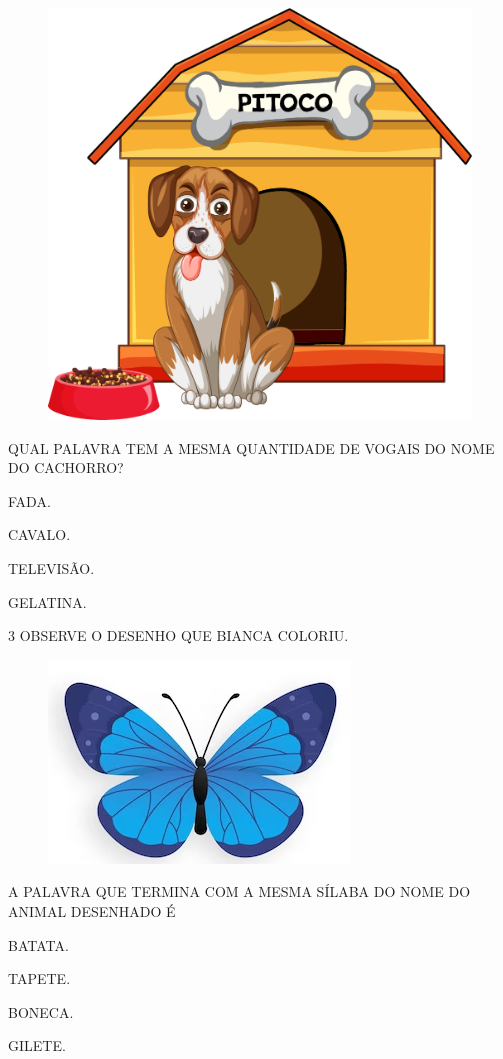 \begin{figure}[htpb]
\centering
\includegraphics[width=.5\textwidth]{media/image226.png}
\end{figure}

QUAL PALAVRA TEM A MESMA QUANTIDADE DE VOGAIS DO NOME DO CACHORRO?

\begin{escolha}
\item FADA.

\item CAVALO.

\item TELEVISÃO.

\item GELATINA.
\end{escolha}

\num{3} OBSERVE O DESENHO QUE BIANCA COLORIU.

\begin{figure}[htpb]
\centering
\includegraphics[width=.5\textwidth]{media/image227.png}
\end{figure}


A PALAVRA QUE TERMINA COM A MESMA SÍLABA DO NOME DO ANIMAL DESENHADO É

\begin{escolha}
\item BATATA.

\item TAPETE.

\item BONECA.

\item GILETE.
\end{escolha}

